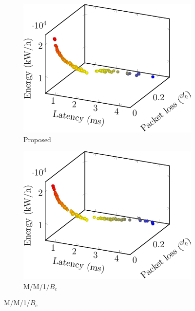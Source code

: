\begin{figure}[t!]
    \centering

    \begin{subfigure}[b]{0.48\linewidth}
        \includegraphics[width=\textwidth]{graphs/model/proposed-crop}
        \caption{Proposed}
    \end{subfigure}
    \begin{subfigure}[b]{0.48\linewidth}
        \includegraphics[width=\textwidth]{graphs/model/mm1k-crop}
        \caption{M/M/1/$B_c$}
    \end{subfigure}

    \vspace{1em}


\end{figure}
